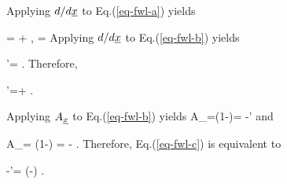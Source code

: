 Applying $d/d{\underline{x}}$ to Eq.(\ref{eq-fwl-a})
yields

\beq
\pder{\rvy}{\rvx}=
\alp
+\beta\pder{\rvd}{\rvx}
\;,\quad
\gamma=\pder{\rvd}{\rvx}
\eeq
Applying $d/d{\underline{x}}$ to Eq.(\ref{eq-fwl-b})
yields


\beq
\alp'=\pder{\rvy}{\rvx}
\;.
\eeq
Therefore,

\beq
\alp'=\alp +\beta\gamma
\;.
\eeq

Applying $A_{\underline{x}}$ to Eq.(\ref{eq-fwl-b})
yields
\beq
A_\rvx\rvy=(1-\rvx\pder{}{\rvx})\rvy=
\rvy-\alp'\rvx
\eeq
and

\beq
A_\rvx\rvd=
(1-\rvx\pder{}{\rvx})\rvd
=
\rvd-\gamma\rvx
\;.
\eeq
Therefore, Eq.(\ref{eq-fwl-c})
is equivalent to

\beq
\rvy-\alpha'\rvx = \beta(\rvd-\gamma\rvx)
\;.
\eeq